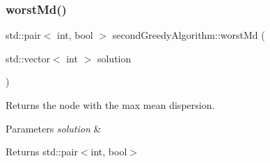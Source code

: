 \subsubsection{\texorpdfstring{worst\+Md()}{worstMd()}}
{\footnotesize\ttfamily std\+::pair$<$ int, bool $>$ second\+Greedy\+Algorithm\+::worst\+Md (\begin{DoxyParamCaption}\item[{std\+::vector$<$ int $>$}]{solution }\end{DoxyParamCaption})}



Returns the node with the max mean dispersion. 


\begin{DoxyParams}{Parameters}
{\em solution} & \\
\hline
\end{DoxyParams}
\begin{DoxyReturn}{Returns}
std\+::pair$<$int, bool$>$ 
\end{DoxyReturn}

